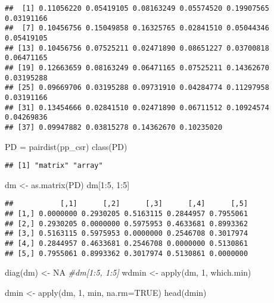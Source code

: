 \documentclass[
]{book}
\newenvironment{Shaded}{\begin{snugshade}}{\end{snugshade}}
\newcommand{\AttributeTok}[1]{\textcolor[rgb]{0.77,0.63,0.00}{#1}}
\newcommand{\CommentTok}[1]{\textcolor[rgb]{0.56,0.35,0.01}{\textit{#1}}}
\newcommand{\ConstantTok}[1]{\textcolor[rgb]{0.00,0.00,0.00}{#1}}
\newcommand{\DecValTok}[1]{\textcolor[rgb]{0.00,0.00,0.81}{#1}}
\newcommand{\FunctionTok}[1]{\textcolor[rgb]{0.00,0.00,0.00}{#1}}
\newcommand{\NormalTok}[1]{#1}
\newcommand{\OtherTok}[1]{\textcolor[rgb]{0.56,0.35,0.01}{#1}}
\newcommand{\SpecialCharTok}[1]{\textcolor[rgb]{0.00,0.00,0.00}{#1}}
\begin{document}
\begin{verbatim}
##  [1] 0.11056220 0.05419105 0.08163249 0.05574520 0.19907565 0.03191166
##  [7] 0.10456756 0.15049858 0.16325765 0.02841510 0.05044346 0.05419105
## [13] 0.10456756 0.07525211 0.02471890 0.08651227 0.03700818 0.06471165
## [19] 0.12663659 0.08163249 0.06471165 0.07525211 0.14362670 0.03195288
## [25] 0.09669706 0.03195288 0.09731910 0.04284774 0.11297958 0.03191166
## [31] 0.13454666 0.02841510 0.02471890 0.06711512 0.10924574 0.04269836
## [37] 0.09947882 0.03815278 0.14362670 0.10235020
\end{verbatim}

\begin{Shaded}
\begin{Highlighting}[]
\NormalTok{PD }\OtherTok{=} \FunctionTok{pairdist}\NormalTok{(pp\_csr)}
\FunctionTok{class}\NormalTok{(PD)}
\end{Highlighting}
\end{Shaded}

\begin{verbatim}
## [1] "matrix" "array"
\end{verbatim}

\begin{Shaded}
\begin{Highlighting}[]
\NormalTok{dm }\OtherTok{\textless{}{-}} \FunctionTok{as.matrix}\NormalTok{(PD)}
\NormalTok{dm[}\DecValTok{1}\SpecialCharTok{:}\DecValTok{5}\NormalTok{, }\DecValTok{1}\SpecialCharTok{:}\DecValTok{5}\NormalTok{]}
\end{Highlighting}
\end{Shaded}

\begin{verbatim}
##           [,1]      [,2]      [,3]      [,4]      [,5]
## [1,] 0.0000000 0.2930205 0.5163115 0.2844957 0.7955061
## [2,] 0.2930205 0.0000000 0.5975953 0.4633681 0.8993362
## [3,] 0.5163115 0.5975953 0.0000000 0.2546708 0.3017974
## [4,] 0.2844957 0.4633681 0.2546708 0.0000000 0.5130861
## [5,] 0.7955061 0.8993362 0.3017974 0.5130861 0.0000000
\end{verbatim}

\begin{Shaded}
\begin{Highlighting}[]
\FunctionTok{diag}\NormalTok{(dm) }\OtherTok{\textless{}{-}} \ConstantTok{NA}
\CommentTok{\#dm[1:5, 1:5]}
\NormalTok{wdmin }\OtherTok{\textless{}{-}} \FunctionTok{apply}\NormalTok{(dm, }\DecValTok{1}\NormalTok{, which.min)}

\NormalTok{dmin }\OtherTok{\textless{}{-}} \FunctionTok{apply}\NormalTok{(dm, }\DecValTok{1}\NormalTok{, min, }\AttributeTok{na.rm=}\ConstantTok{TRUE}\NormalTok{)}
\FunctionTok{head}\NormalTok{(dmin)}
\end{Highlighting}
\end{Shaded}
\end{document}
